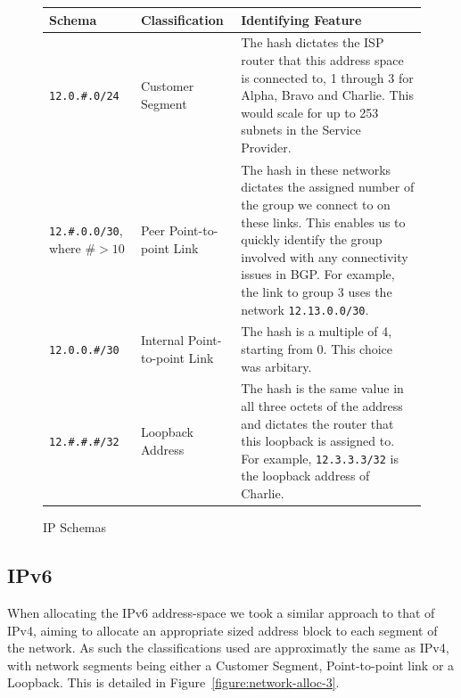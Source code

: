 \begin{figure}[!ht]
    \caption{IP Schemas}
    \label{figure:network-alloc-2}
    \centering
    \begin{tabular}{|p{3cm}|p{3cm}|p{5cm}|}

        \hline
        \textbf{Schema} & \textbf{Classification} & \textbf{Identifying Feature} \\

        \hline
        \texttt{12.0.\#.0/24} & Customer Segment & The hash dictates the ISP
        router that this address space is connected to, 1 through 3 for Alpha, Bravo
        and Charlie. This would scale for up to 253 subnets in the Service Provider.\\
        \hline
        \texttt{12.\#.0.0/30}, where $\#> 10$ & Peer Point-to-point Link &
        The hash in these networks dictates the assigned number of the group we connect
        to on these links. This enables us to quickly identify the group involved with
        any connectivity issues in BGP. For example, the link to group 3 uses the
        network \texttt{12.13.0.0/30}.\\

        \hline
        \texttt{12.0.0.\#/30} & Internal Point-to-point Link &
        The hash is a multiple of 4, starting from 0. This choice was arbitary.\\

        \hline
        \texttt{12.\#.\#.\#/32} & Loopback Address & The hash is
        the same value in all three octets of the address and dictates the router that
        this loopback is assigned to. For example, \texttt{12.3.3.3/32} is the loopback
        address of Charlie.\\

        \hline
    \end{tabular}
\end{figure}

\clearpage

\subsection{IPv6}
When allocating the IPv6 address-space we took a similar approach to that of
IPv4, aiming to allocate an appropriate sized address block to each segment of
the network. As such the classifications used are approximatly the same as
IPv4, with network segments being either a Customer Segment, Point-to-point
link or a Loopback. This is detailed in Figure~\ref{figure:network-alloc-3}.

